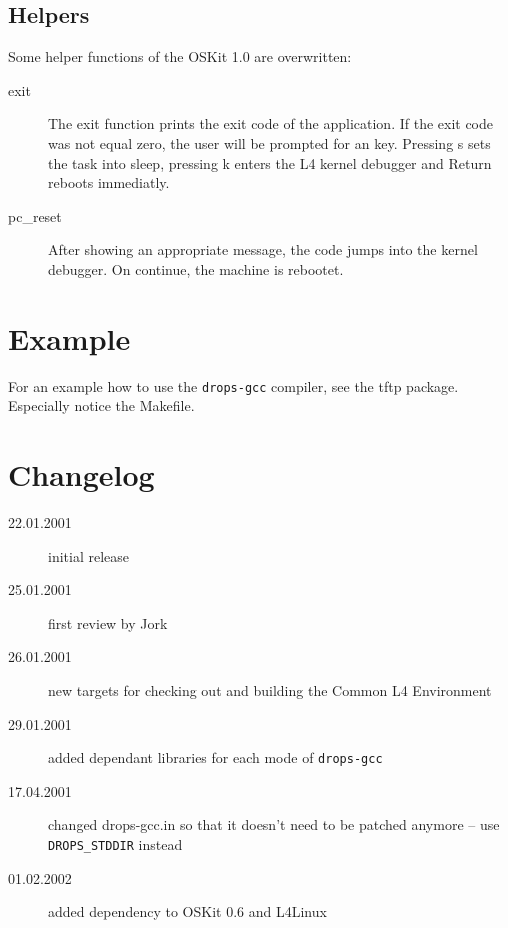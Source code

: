 \documentclass[twocolumn,10pt]{article}
\begin{document}
\subsection{Helpers}

Some helper functions of the OSKit 1.0 are overwritten:
\begin{description}
\item[exit] 
  The exit function prints the exit code of the application. If
  the exit code was not equal zero, the user will be prompted for
  an key. Pressing s sets the task into sleep, pressing k enters
  the L4 kernel debugger and Return reboots immediatly.
\item[pc\_reset]
  After showing an appropriate message, the code jumps into the kernel
  debugger. On continue, the machine is rebootet.
\end{description}

\section{Example}
For an example how to use the \texttt{drops-gcc} compiler, see the
tftp package. Especially notice the Makefile.


\section{Changelog}
\begin{description}
\item[22.01.2001] initial release
\item[25.01.2001] first review by Jork
\item[26.01.2001] new targets for checking out and building the
  Common L4 Environment
\item[29.01.2001] added dependant libraries for each mode of 
  \texttt{drops-gcc}
\item[17.04.2001] changed drops-gcc.in so that it doesn't need to
  be patched anymore -- use \texttt{DROPS\_STDDIR} instead
\item[01.02.2002] added dependency to OSKit 0.6 and L4Linux


\end{description}
\end{document}

